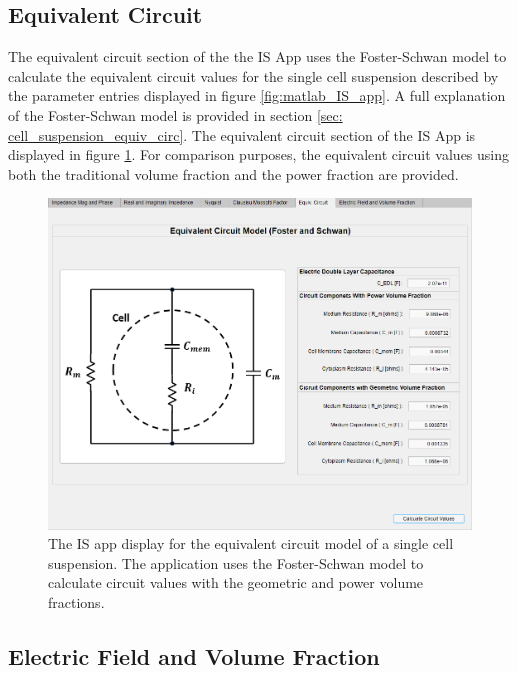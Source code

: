 \subsection*{Equivalent Circuit}
\par The equivalent circuit section of the the IS App uses the Foster-Schwan model to calculate the equivalent circuit values for the single cell suspension described by the parameter entries displayed in figure \ref{fig:matlab_IS_app}. A full explanation of the Foster-Schwan model is provided in section \ref{sec: cell_suspension_equiv_circ}. The equivalent circuit section of the IS App is displayed in figure \ref{fig:is_app_equivalent_circuit}. For comparison purposes, the equivalent circuit values using both the traditional volume fraction and the power fraction are provided.

\begin{figure}[h]
    \centering
    \includegraphics[width=\textwidth]{images/impedanceDisplayEquivCircuitV2.png}
    \caption[The IS app: Equivalent Circuit]{The IS app display for the equivalent circuit model of a single cell suspension. The application uses the Foster-Schwan model to calculate circuit values with the geometric and power volume fractions.}
    \label{fig:is_app_equivalent_circuit}
\end{figure}

\subsection*{Electric Field and Volume Fraction}

